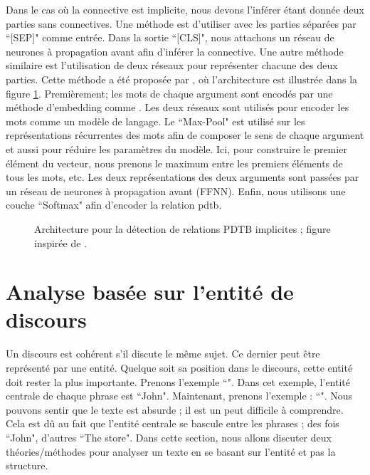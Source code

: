 \documentclass{KodeBook}
\begin{document}
Dans le cas où la connective est implicite, nous devons l'inférer étant donnée deux parties sans connectives. 
Une méthode est d'utiliser  avec les parties séparées par ``[SEP]" comme entrée. 
Dans la sortie ``[CLS]", nous attachons un réseau de neurones à propagation avant afin d'inférer la connective.
Une autre méthode similaire est l'utilisation de deux réseaux  pour représenter chacune des deux parties. 
Cette méthode a été proposée par \citet{2020-liang-al}, où l'architecture est illustrée dans la figure \ref{fig:pdtb-liang}.
Premièrement; les mots de chaque argument sont encodés par une méthode d'embedding comme .
Les deux réseaux  sont utilisés pour encoder les mots comme un modèle de langage.
Le ``Max-Pool" est utilisé sur les représentations récurrentes des mots afin de composer le sens de chaque argument et aussi pour réduire les paramètres du modèle.
Ici, pour construire le premier élément du vecteur, nous prenons le maximum entre les premiers éléments de tous les mots, etc.
Les deux représentations des deux arguments sont passées par un réseau de neurones à propagation avant (FFNN).
Enfin, nous utilisons une couche ``Softmax" afin d'encoder la relation \ac{pdtb}.
\begin{figure}[ht]
	\centering
	\caption[Architecture pour la détection de relations PDTB implicites]{Architecture pour la détection de relations PDTB implicites ; figure inspirée de \cite{2020-liang-al}.}
	\label{fig:pdtb-liang}
\end{figure}

\section{Analyse basée sur l'entité de discours}

Un discours est cohérent s'il discute le même sujet.
Ce dernier peut être représenté par une entité. 
Quelque soit sa position dans le discours, cette entité doit rester la plus importante.
Prenons l'exemple ``". 
Dans cet exemple, l'entité centrale de chaque phrase est ``John". 
Maintenant, prenons l'exemple : ``".
Nous pouvons sentir que le texte est absurde ; il est un peut difficile à comprendre. 
Cela est dû au fait que l'entité centrale se bascule entre les phrases ; des fois ``John", d'autres ``The store". 
Dans cette section, nous allons discuter deux théories/méthodes pour analyser un texte en se basant sur l'entité et pas la structure.
\end{document}
